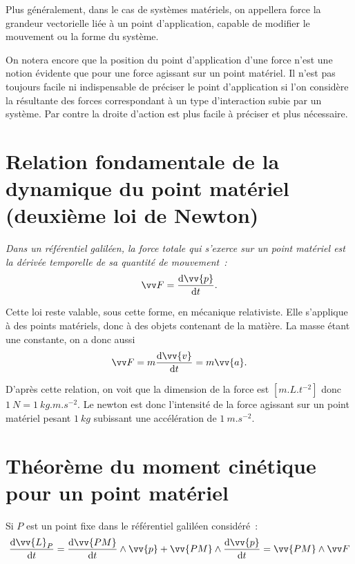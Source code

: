 Plus généralement, dans le cas de systèmes matériels, on appellera force la grandeur vectorielle liée à un point d'application, capable de modifier le mouvement ou la forme du système.

On notera encore que la position du point d'application d'une force n'est une notion évidente que pour une force agissant sur un point matériel. Il n'est pas toujours facile ni indispensable de préciser le point d'application si l'on considère la résultante des forces correspondant à un type d'interaction subie par un système. Par contre la droite d'action est plus facile à préciser et plus nécessaire.

\section{Relation fondamentale de la dynamique du point matériel (deuxième loi de Newton)}
\label{chap2-sec:relationfondamentaledeladynamique}

\emph{Dans un référentiel galiléen, la force totale qui s'exerce sur un point matériel est la dérivée temporelle de sa quantité de mouvement~:
  \begin{equation}
    \vF = \derived{\vv{p}}{t}.
  \end{equation}
}

Cette loi reste valable, sous cette forme, en mécanique relativiste. Elle s'applique à des points matériels, donc à des objets contenant de la matière. La masse étant une constante, on a donc aussi
\begin{equation}
  \vF = m \derived{\vv{v}}{t}=m\vv{a}.
\end{equation}

D'après cette relation, on voit que la dimension de la force est $[m.L.t^{-2}]$ donc $\SI{1}{N}=\SI{1}{kg.m.s^{-2}}$. Le newton est donc l'intensité de la force agissant sur un point matériel pesant $\SI{1}{kg}$ subissant une accélération de $\SI{1}{m.s^{-2}}$.

\section{Théorème du moment cinétique pour un point matériel}
\label{chap2-sec:theoremedumomentcinetique}

Si $P$ est un point fixe dans le référentiel galiléen considéré~:
\begin{equation}
  \derived{\vv{L}_P}{t} = \derived{\vv{PM}}{t} \wedge \vv{p} +\vv{PM} \wedge  \derived{\vv{p}}{t} = \vv{PM} \wedge \vF
\end{equation}

